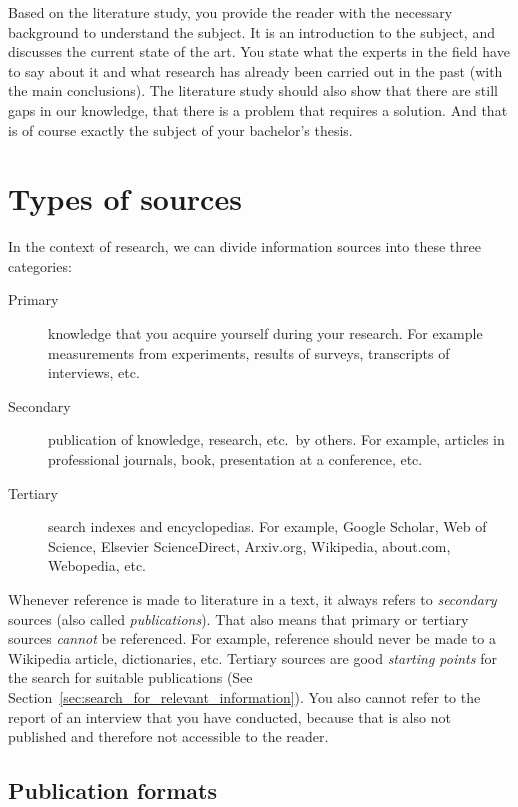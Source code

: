 Based on the literature study, you provide the reader with the necessary background to understand the subject. It is an introduction to the subject, and discusses the current state of the art. You state what the experts in the field have to say about it and what research has already been carried out in the past (with the main conclusions). The literature study should also show that there are still gaps in our knowledge, that there is a problem that requires a solution. And that is of course exactly the subject of your bachelor's thesis.

\section{Types of sources}
\label{sec:types-sources}

In the context of research, we can divide information sources into these three categories:

\begin{description}
 \item[Primary] knowledge that you acquire yourself during your research. For example measurements from experiments, results of surveys, transcripts of interviews, etc.
 \item[Secondary] publication of knowledge, research, etc.~by others. For example, articles in professional journals, book, presentation at a conference, etc.
 \item[Tertiary] search indexes and encyclopedias. For example, Google Scholar, Web of Science, Elsevier ScienceDirect, Arxiv.org, Wikipedia, about.com, Webopedia, etc.
\end{description}

Whenever reference is made to literature in a text, it always refers to \emph{secondary} sources (also called \emph{publications}). That also means that primary or tertiary sources \emph{cannot} be referenced. For example, reference should never be made to a Wikipedia article, dictionaries, etc. Tertiary sources are good \textit{starting points} for the search for suitable publications (See Section~\ref{sec:search_for_relevant_information}). You also cannot refer to the report of an interview that you have conducted, because that is also not published and therefore not accessible to the reader.

\subsection{Publication formats}
\label{sub:publicationformats}

